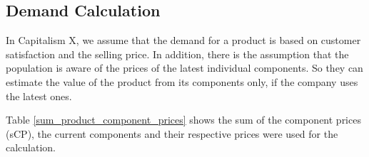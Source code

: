 \subsection{Demand Calculation} \label{demandCalc}


In Capitalism X, we assume that the demand for a product is based on customer satisfaction and the selling price. In addition, there is the assumption that the population is aware of the prices of the latest individual components. So they can estimate the value of the product from its components only, if the company uses the latest ones.
 
Table \ref{sum_product_component_prices} shows the sum of the component prices (\gls{sCP}), the current components and their respective prices were used for the calculation.

